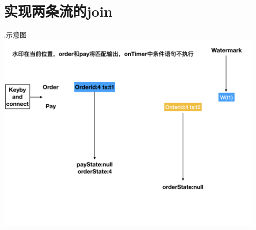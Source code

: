 \documentclass[oneside]{ctexbook}
\begin{document}
\section{实现两条流的join}

.示意图
\noindent \includegraphics[width=\textwidth]{twostreamsjoin.png}
\end{document}
